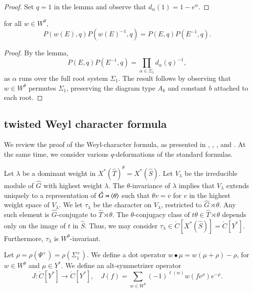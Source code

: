 \begin{proof}  Set $q=1$ in the lemma and observe that $d_\alpha(1)=1-e^\alpha$.
\end{proof}


\begin{corollary}\label{cor:weyl-p}  
for all $w\in W^\theta$,
\[
P(w(E),q) P(w(E)^{-1},q) = P(E,q)P(E^{-1},q).
\]
\end{corollary}

\begin{proof} 
By the lemma,
\[
P(E,q)P(E^{-1},q) = \prod_{\alpha\in \Sigma_1} d_{\alpha}(q)^{-1},
\]
as $\alpha$ runs over the full root system $\Sigma_1$.
The result follows by observing  that $w\in W^\theta$ permutes $\Sigma_1$, preserving the  diagram type $A_k$
 and constant $b$ attached to each root.
\end{proof}


\newpage

\subsection{twisted Weyl character formula}

We review the proof of the Weyl-character formula, as presented in \cite{kostant1961lie}, 
\cite{jantzen1977darstellungen}, \cite{wendt2001weyl}, and \cite{kumar2009characters}.
At the same time, we consider various $q$-deformations of the standard formulas.

Let $\lambda$ be a dominant weight in $X^*(\hat T)^\theta = X^*(\hat S)$.  Let $V_\lambda$ be the irreducible module
of $\hat G$ with highest weight $\lambda$.  The $\theta$-invariance of $\lambda$ implies that $V_\lambda$
extends uniquely to a representation of $\hat G \rtimes \langle{\theta}\rangle$ such that $\theta v = v$ for $v$ in the
highest weight space of $V_\lambda$.  We let $\tau_\lambda$ be the character on $V_\lambda$, restricted to $\hat G\rtimes\theta$.  Any such element is $\hat G$-conjugate to $\hat T\rtimes\theta$.
The $\theta$-conjugacy class of $t\theta\in \hat T\rtimes\theta$ 
depends only on the image of $t$ in $\hat S$.  
Thus, we may consider
$\tau_\lambda\in \ring{C}[X^*(\hat S)] =\ring{C}[Y^*]$.  Furthermore, $\tau_\lambda$ is $W^\theta$-invariant.

Let $\rho = \rho(\Psi^+) = \rho(\Sigma^+_1)$.
We define a dot operator $w\bullet \mu = w(\mu+\rho)-\rho$, for $w\in W^\theta$ and $\mu\in Y^*$.
We define an alt-symmetrizer operator
\[
J:\ring{C}[Y^*]\to \ring{C}[Y^*],\quad J(f) = \sum_{w\in W^\theta} (-1)^{\ell(w)} w(f e^\rho) e^{-\rho}.
\]

